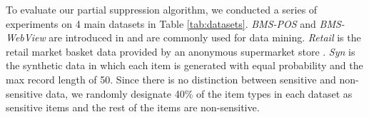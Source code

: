 

To evaluate our partial suppression algorithm,
we conducted a series of experiments on
4 main datasets in Table \ref{tab:datasets}. {\em BMS-POS} and {\em BMS-WebView} are
introduced in \cite{Zheng:2001:RWP:502512.502572} and are commonly used for
data mining. {\em Retail} is the retail market basket data provided by an anonymous
supermarket store \cite{brijs99:retailData}. {\em Syn} is the synthetic data in
which each item is generated with equal probability and the max record length
of 50.
Since there is no distinction between sensitive and non-sensitive data,
 we randomly designate 40\% of the item types in each dataset as
sensitive items and the rest of the items are non-sensitive.


